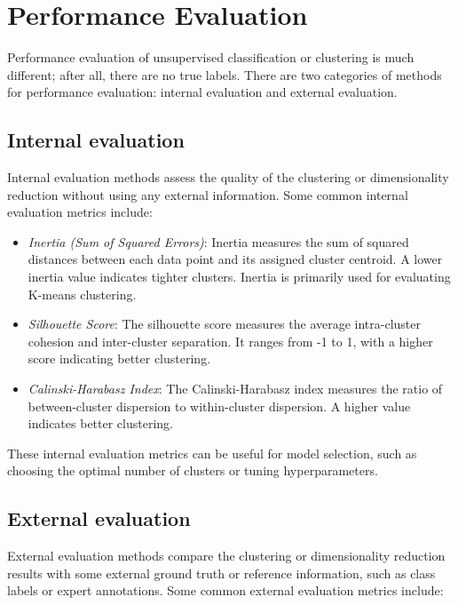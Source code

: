 \documentclass[12pt]{article}
\begin{document}

\section{Performance Evaluation}
Performance evaluation of unsupervised classification or clustering is much different; after all, there are no true labels. There are two categories of methods for performance evaluation: internal evaluation and external evaluation.

\subsection{Internal evaluation}
 Internal evaluation methods assess the quality of the clustering or dimensionality reduction without using any external information. Some common internal evaluation metrics include:
    \begin{itemize}
      \item \textit{Inertia (Sum of Squared Errors)}: Inertia measures the sum of squared distances between each data point and its assigned cluster centroid. A lower inertia value indicates tighter clusters. Inertia is primarily used for evaluating K-means clustering.
      \item \textit{Silhouette Score}: The silhouette score measures the average intra-cluster cohesion and inter-cluster separation. It ranges from -1 to 1, with a higher score indicating better clustering.
      \item \textit{Calinski-Harabasz Index}: The Calinski-Harabasz index measures the ratio of between-cluster dispersion to within-cluster dispersion. A higher value indicates better clustering.
    \end{itemize}
  These internal evaluation metrics can be useful for model selection, such as choosing the optimal number of clusters or tuning hyperparameters.


\subsection{External evaluation}
External evaluation methods compare the clustering or dimensionality reduction results with some external ground truth or reference information, such as class labels or expert annotations. Some common external evaluation metrics include:
\end{document}
